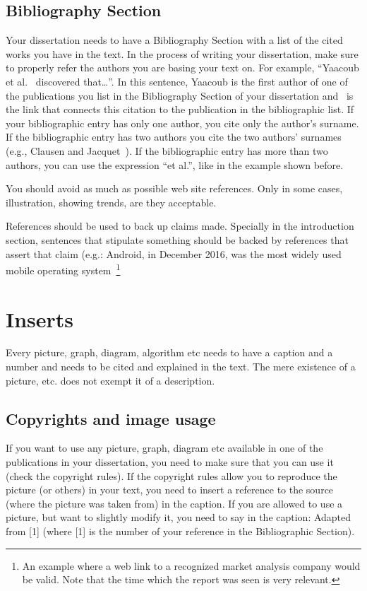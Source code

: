 \subsection{Bibliography Section}
Your dissertation needs to have a Bibliography Section with a list of the cited works you have in
the text. In the process of writing your dissertation, make sure to properly refer the authors you are
basing your text on. For example, “Yaacoub et al.~\cite{yaacoub2012} discovered that\ldots”. In this sentence, Yaacoub is the
first author of one of the publications you list in the Bibliography Section of your dissertation and~\cite{yaacoub2012} is the link that connects this citation to the publication in the bibliographic list. If your
bibliographic entry has only one author, you cite only the author's surname. If the bibliographic
entry has two authors you cite the two authors' surnames (e.g., Clausen and Jacquet~\cite{Clausen2003}). If the
bibliographic entry has more than two authors, you can use the expression “et al.”, like in the
example shown before.

You should avoid as much as possible web site references. Only in some cases, illustration, showing trends, are they acceptable.

References should be used to back up claims made. Specially in the introduction section, sentences that stipulate something should be backed by references that assert that claim (e.g.: Android, in December 2016, was the most widely used mobile operating system~\cite{netMarketShareMobileOS}\footnote{An example where a web link to a recognized market analysis company would be valid. Note that the time which the report was seen is very relevant.}

\section{Inserts}
Every picture, graph, diagram, algorithm etc needs to have a caption and a number and needs to
be cited and explained in the text. The mere existence of a picture, etc. does not exempt it of a description. 

\subsection{Copyrights and image usage}
If you want to use any picture, graph, diagram etc available in one of the publications in your
dissertation, you need to make sure that you can use it (check the copyright rules). If the copyright
rules allow you to reproduce the picture (or others) in your text, you need to insert a reference to the
source (where the picture was taken from) in the caption. If you are allowed to use a picture, but
want to slightly modify it, you need to say in the caption: Adapted from [1] (where [1] is the
number of your reference in the Bibliographic Section).


